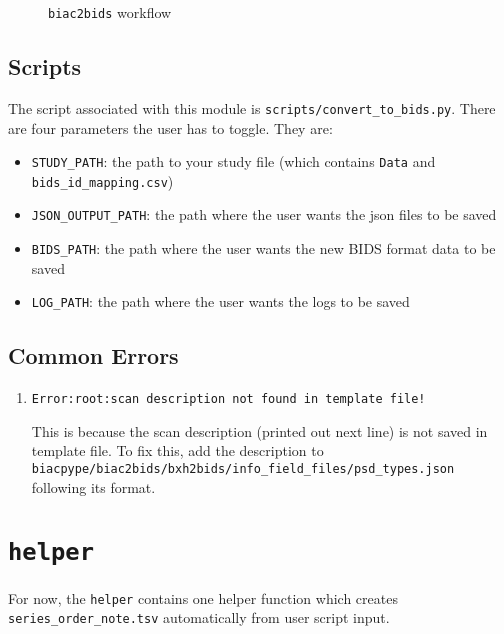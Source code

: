 \documentclass[12pt]{myland}
\def\<#1>{\texttt{#1}}
\begin{document}
    \begin{figure}[h]
        \begin{mybox}
            \centering
        \end{mybox}
        \caption{\<biac2bids> workflow}
    \end{figure}

    \subsection{Scripts}
    The script associated with this module is \<scripts/convert\_to\_bids.py>. There are four 
    parameters the user has to toggle. They are:
    \begin{itemize}
        \item \<STUDY\_PATH>: the path to your study file (which contains \<Data> and \<bids\_id\_mapping.csv>)
        \item \<JSON\_OUTPUT\_PATH>: the path where the user wants the json files to be saved
        \item \<BIDS\_PATH>: the path where the user wants the new BIDS format data to be saved
        \item \<LOG\_PATH>: the path where the user wants the logs to be saved
    \end{itemize}

    \subsection{Common Errors}
    \begin{enumerate}
        \item \<Error:root:scan description not found in template file!> \par
            This is because the scan description (printed out next line) is not saved in template file. 
            To fix this, add the description to \<biacpype/biac2bids/bxh2bids/info\_field\_files/psd\_types.json> following
            its format.
    \end{enumerate}


\section{\<helper>}
For now, the \<helper> contains one helper function which creates \<series\_order\_note.tsv> automatically from user 
script input.
\end{document}
